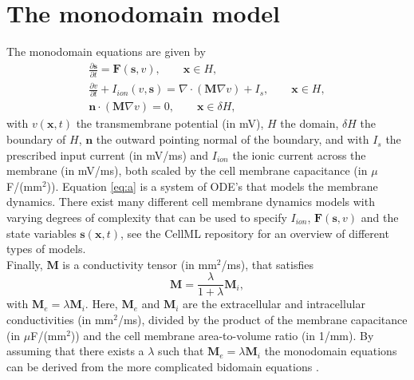 \documentclass[12pt,a4paper]{article}
\begin{document}
 
\section{The monodomain model} \label{The monodomain model}
The monodomain equations are given by 
\begin{eqnarray} \label{eq:a}
\frac{\partial \mathbf{s}}{\partial t}= \mathbf{F}(\mathbf{s},v), \qquad \mathbf{x} \in H, \\
\frac{\partial v}{\partial t} + I_{ion}(v,\mathbf{s}) =\nabla \label{eq:b} \cdot(\mathbf{M}\nabla v) + I_s,\qquad \mathbf{x} \in H, \\ \label{eq:c}
\mathbf{n}\cdot (\mathbf{M}\nabla v)=0, \qquad \mathbf{x} \in \delta H,
\end{eqnarray}
with $v(\mathbf{x},t)$ the transmembrane potential (in mV), $H$ the domain, $\delta H$ the boundary of $H$, $\mathbf{n}$ the outward pointing normal of the boundary, and with $I_s$ the prescribed input current (in mV/ms) and $I_{ion}$ the ionic current across the membrane (in mV/ms), both scaled by the cell membrane capacitance (in $\mu$F/(mm$^2$)). 
Equation \eqref{eq:a} is a system of ODE's that models the membrane dynamics. There exist many different cell membrane dynamics models with varying degrees of complexity that can be used to specify $I_{ion}$, $\mathbf{F}(\mathbf{s},v)$ and the state variables $\mathbf{s}(\mathbf{x},t)$, see the CellML repository \cite{cellml} for an overview of different types of models. \\ Finally, $\mathbf{M}$ is a conductivity tensor (in mm$^2$/ms), that satisfies 
\begin{equation}
\mathbf{M}=\frac{\lambda}{1+\lambda}\mathbf{M}_i,\label{eq:d}
\end{equation}
with $\mathbf{M}_e=\lambda \mathbf{M}_i$. Here, $\mathbf{M}_e$ and $\mathbf{M}_i$ are the extracellular and intracellular conductivities (in mm$^2$/ms), divided by the product of the membrane capacitance (in $\mu$F/(mm$^2$)) and the cell membrane area-to-volume ratio (in 1/mm). By assuming that there exists a $\lambda$ such that $\mathbf{M}_e=\lambda \mathbf{M}_i$ the monodomain equations can be derived from the more complicated bidomain equations \cite{Sundnes}.
\end{document}
